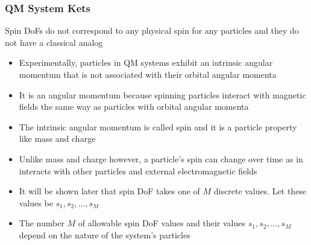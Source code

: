 \documentclass[8pt,t,mathserif,aspectratio=169]{beamer}
\begin{document}
\begin{frame}
  \frametitle{QM System Kets}
  \vspace{1mm}
  Spin DoFs do not correspond to any physical spin for any particles and they do not have a classical analog
  \begin{itemize}
    \item Experimentally, particles in QM systems exhibit an intrinsic angular momentum that is not associated with their orbital angular momenta
    \item It is an angular momentum because spinning particles interact with magnetic fields the same way as particles with orbital angular momenta 
    \item The intrinsic angular momentum is called spin and it is a particle property like mass and charge
    \item Unlike mass and charge however, a particle's spin can change over time as in interacts with other particles and external electromagnetic fields
    \item It will be shown later that spin DoF takes one of $M$ discrete values. Let these values be $s_1,s_2,...,s_M$
    \item The number $M$ of allowable spin DoF values and their values $s_1,s_2,...,s_M$ depend on the nature of the system's particles
  \end{itemize}
\end{frame}
\end{document}
